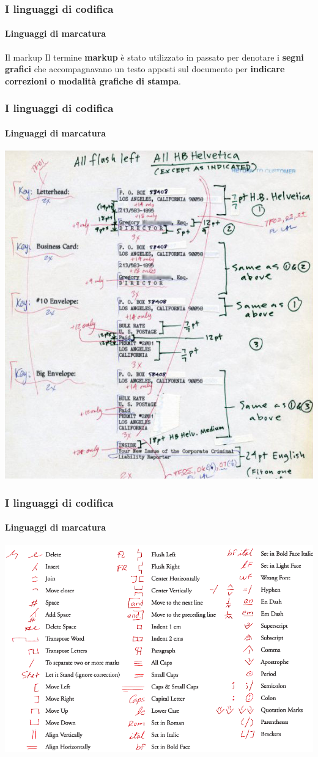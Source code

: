 \begin{frame}
	\frametitle{I linguaggi di codifica}
	\framesubtitle{Linguaggi di marcatura}
	\addtocounter{nframe}{1}

	\begin{block}{Il markup}
		Il termine \textbf{markup} è stato utilizzato in passato per denotare i \textbf{segni grafici} che accompagnavano un testo apposti sul documento per \textbf{indicare correzioni o modalità grafiche di stampa}.
	\end{block}

\end{frame}

\begin{frame}
	\frametitle{I linguaggi di codifica}
	\framesubtitle{Linguaggi di marcatura}
	\addtocounter{nframe}{1}

	\begin{center}
		\includegraphics[width=.6\textwidth]{imgs/xml-markup001.jpg}
	\end{center}

\end{frame}

\begin{frame}
	\frametitle{I linguaggi di codifica}
	\framesubtitle{Linguaggi di marcatura}
	\addtocounter{nframe}{1}

	\begin{center}
		\includegraphics[width=.9\textwidth]{imgs/xml-MarkupConvention.png}
	\end{center}

\end{frame}


